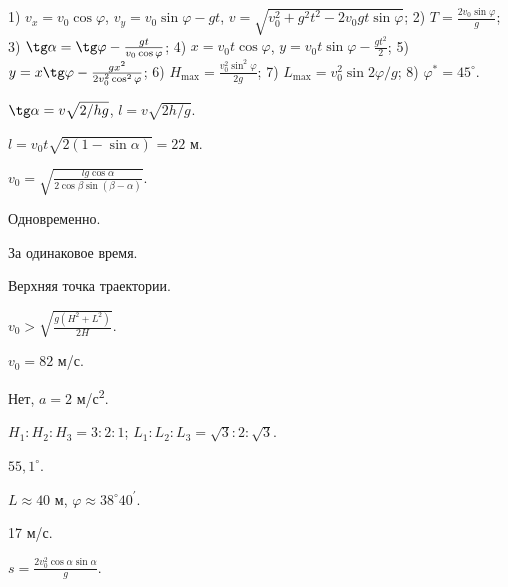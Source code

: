 \begin{Answer}{26}
1) $v_x = v_0 \cos \varphi$, $v_y = v_0 \sin \varphi - gt$, $v = \sqrt{v_{0}^{2} + g^2 t^2 - 2v_{0}gt \sin \varphi}$; 2) $T = \frac{2v_{0}\sin \varphi}{g}$; 3) $ \tg \alpha = \tg \varphi - \frac{gt}{v_0 \cos \varphi}$; 4) $x = v_0 t \cos \varphi$, $y = v_0 t \sin \varphi - \frac{gt^2}{2}$; 5) $y = x \tg \varphi - \frac{gx^2}{2v_{0}^{2} \cos^2 \varphi} $; 6) $H_{\max} = \frac{v_{0}^{2} \sin^2 \varphi}{2g}$; 7) $L_{\max} = v_{0}^2 \sin 2 \varphi / g$; 8) $\varphi^{*} = 45^{\circ}$.
\end{Answer}
\begin{Answer}{27}
$\tg \alpha = v \sqrt{2/hg}$, $l = v \sqrt{2h/g}$.
\end{Answer}
\begin{Answer}{28}
$l = v_0 t \sqrt{2(1-\sin \alpha)} = 22$ м.
\end{Answer}
\begin{Answer}{29}
$v_0 = \sqrt{\frac{lg \cos \alpha}{2 \cos \beta \sin \left( \beta - \alpha \right)}}$.
\end{Answer}
\begin{Answer}{30}
Одновременно.
\end{Answer}
\begin{Answer}{31}
За одинаковое время.
\end{Answer}
\begin{Answer}{32}
Верхняя точка траектории.
\end{Answer}
\begin{Answer}{33}
$v_0 > \sqrt{\frac{g(H^2+L^2)}{2H}}$.
\end{Answer}
\begin{Answer}{34}
$v_0 = 82$ м/с.
\end{Answer}
\begin{Answer}{35}
Нет, $a = 2$ м/с\textsuperscript{2}.
\end{Answer}
\begin{Answer}{36}
$H_1 : H_2 : H_3 = 3 : 2 : 1$; $L_1 : L_2 : L_3 = \sqrt{3} : 2 : \sqrt{3}$.
\end{Answer}
\begin{Answer}{37}
$55,1^{ \circ }$.
\end{Answer}
\begin{Answer}{38}
$L \approx 40$ м, $\varphi \approx 38^{\circ}40^\prime$.
\end{Answer}
\begin{Answer}{39}
17 м/с.
\end{Answer}
\begin{Answer}{40}
$s = \frac{2 v_0^2 \cos \alpha \sin \alpha}{g}$.
\end{Answer}
